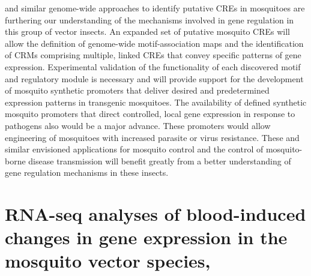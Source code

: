 \citet{Sieglaff2009} and similar genome-wide approaches to identify putative \glspl{CRE} in mosquitoes \cite{Hernandez-Romano2008} are furthering our understanding of the mechanisms involved in gene regulation in this group of vector insects. An expanded set of putative mosquito \glspl{CRE} will allow the definition of genome-wide motif-association maps and the identification of \glspl{CRM} comprising multiple, linked \glspl{CRE} that convey specific patterns of gene expression. Experimental validation of the functionality of each discovered motif and regulatory module is necessary and will provide support for the development of mosquito synthetic promoters that deliver desired and predetermined expression patterns in transgenic mosquitoes. 
The availability of defined synthetic mosquito promoters that direct controlled, local gene expression in response to pathogens also would be a major advance. These promoters would allow engineering of mosquitoes with increased parasite or virus resistance. These and similar envisioned applications for mosquito control and the control of mosquito-borne disease transmission will benefit greatly from a better understanding of gene regulation mechanisms in these insects.










\pagebreak

\section{RNA-seq analyses of blood-induced changes in gene expression in the mosquito vector species, \Aea\ \cite{Bonizzoni2011}}




